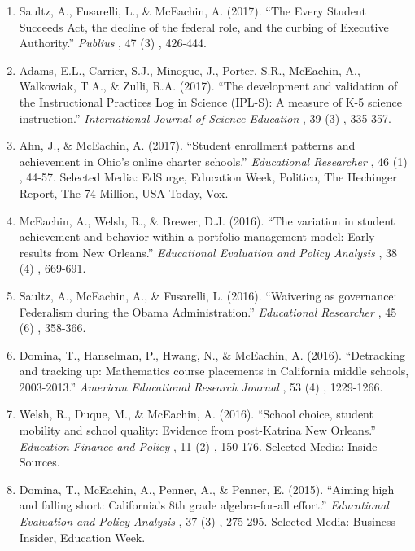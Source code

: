 \documentclass[11pt, letterpaper]{article}
\begin{document}
\begin{enumerate}[leftmargin=2em]
  \item Saultz, A., Fusarelli, L., \& McEachin, A. (2017).
  ``The Every Student Succeeds Act, the decline of the federal role, and the curbing of Executive Authority.''
  \textit{Publius}%
, 47%
(3)%
, 426-444.

  \item Adams, E.L., Carrier, S.J., Minogue, J., Porter, S.R., McEachin, A., Walkowiak, T.A., \& Zulli, R.A. (2017).
  ``The development and validation of the Instructional Practices Log in Science (IPL-S): A measure of K-5 science instruction.''
  \textit{International Journal of Science Education}%
, 39%
(3)%
, 335-357.

  \item Ahn, J., \& McEachin, A. (2017).
  ``Student enrollment patterns and achievement in Ohio's online charter schools.''
  \textit{Educational Researcher}%
, 46%
(1)%
, 44-57.
  Selected Media: EdSurge, Education Week, Politico, The Hechinger Report, The 74 Million, USA Today, Vox.

  \item McEachin, A., Welsh, R., \& Brewer, D.J. (2016).
  ``The variation in student achievement and behavior within a portfolio management model: Early results from New Orleans.''
  \textit{Educational Evaluation and Policy Analysis}%
, 38%
(4)%
, 669-691.

  \item Saultz, A., McEachin, A., \& Fusarelli, L. (2016).
  ``Waivering as governance: Federalism during the Obama Administration.''
  \textit{Educational Researcher}%
, 45%
(6)%
, 358-366.

  \item Domina, T., Hanselman, P., Hwang, N., \& McEachin, A. (2016).
  ``Detracking and tracking up: Mathematics course placements in California middle schools, 2003-2013.''
  \textit{American Educational Research Journal}%
, 53%
(4)%
, 1229-1266.

  \item Welsh, R., Duque, M., \& McEachin, A. (2016).
  ``School choice, student mobility and school quality: Evidence from post-Katrina New Orleans.''
  \textit{Education Finance and Policy}%
, 11%
(2)%
, 150-176.
  Selected Media: Inside Sources.

  \item Domina, T., McEachin, A., Penner, A., \& Penner, E. (2015).
  ``Aiming high and falling short: California's 8th grade algebra-for-all effort.''
  \textit{Educational Evaluation and Policy Analysis}%
, 37%
(3)%
, 275-295.
  Selected Media: Business Insider, Education Week.


\end{enumerate}
\end{document}
